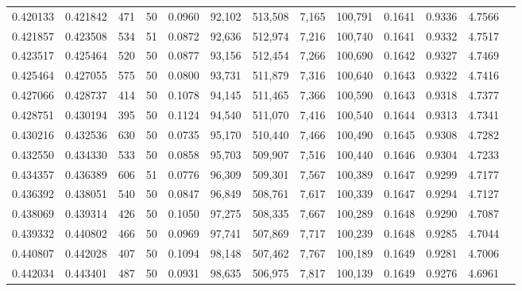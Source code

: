 \begin{tabular}{rrrrrrrrrrrrr}
0.420133 & 0.421842 &   471 &  50 &                                     0.0960 &  92,102 & 513,508 &   7,165 & 100,791 & 0.1641 & 0.9336 & 4.7566 \\
0.421857 & 0.423508 &   534 &  51 &                                     0.0872 &  92,636 & 512,974 &   7,216 & 100,740 & 0.1641 & 0.9332 & 4.7517 \\
0.423517 & 0.425464 &   520 &  50 &                                     0.0877 &  93,156 & 512,454 &   7,266 & 100,690 & 0.1642 & 0.9327 & 4.7469 \\
0.425464 & 0.427055 &   575 &  50 &                                     0.0800 &  93,731 & 511,879 &   7,316 & 100,640 & 0.1643 & 0.9322 & 4.7416 \\
0.427066 & 0.428737 &   414 &  50 &                                     0.1078 &  94,145 & 511,465 &   7,366 & 100,590 & 0.1643 & 0.9318 & 4.7377 \\
0.428751 & 0.430194 &   395 &  50 &                                     0.1124 &  94,540 & 511,070 &   7,416 & 100,540 & 0.1644 & 0.9313 & 4.7341 \\
0.430216 & 0.432536 &   630 &  50 &                                     0.0735 &  95,170 & 510,440 &   7,466 & 100,490 & 0.1645 & 0.9308 & 4.7282 \\
0.432550 & 0.434330 &   533 &  50 &                                     0.0858 &  95,703 & 509,907 &   7,516 & 100,440 & 0.1646 & 0.9304 & 4.7233 \\
0.434357 & 0.436389 &   606 &  51 &                                     0.0776 &  96,309 & 509,301 &   7,567 & 100,389 & 0.1647 & 0.9299 & 4.7177 \\
0.436392 & 0.438051 &   540 &  50 &                                     0.0847 &  96,849 & 508,761 &   7,617 & 100,339 & 0.1647 & 0.9294 & 4.7127 \\
0.438069 & 0.439314 &   426 &  50 &                                     0.1050 &  97,275 & 508,335 &   7,667 & 100,289 & 0.1648 & 0.9290 & 4.7087 \\
0.439332 & 0.440802 &   466 &  50 &                                     0.0969 &  97,741 & 507,869 &   7,717 & 100,239 & 0.1648 & 0.9285 & 4.7044 \\
0.440807 & 0.442028 &   407 &  50 &                                     0.1094 &  98,148 & 507,462 &   7,767 & 100,189 & 0.1649 & 0.9281 & 4.7006 \\
0.442034 & 0.443401 &   487 &  50 &                                     0.0931 &  98,635 & 506,975 &   7,817 & 100,139 & 0.1649 & 0.9276 & 4.6961 \\

\end{tabular}
